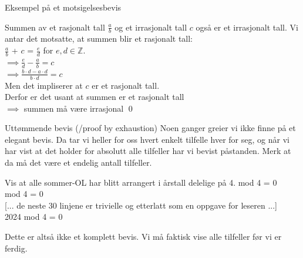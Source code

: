 \begin{frame}{Eksempel på et motsigelsesbevis}
    \begin{block}{Summen av et rasjonalt tall $\frac{a}{b}$ og et irrasjonalt tall $c$ også er et irrasjonalt tall.}
        \pause
        Vi antar det motsatte, at summen blir et rasjonalt tall: \\
        \pause
        $\frac{a}{b}$ + $c$ = $\frac{e}{d}$ for $e, d \in \mathbb{Z}$.\\
        \pause
        $\implies \frac{e}{d} - \frac{a}{b} = c$\\
        \pause
        $\implies \frac{b\cdot d - a \cdot d}{b\cdot d} = c$\\
        \pause
        Men det impliserer at $c$ er et rasjonalt tall. \text{\Lightning}\\
        \pause
        Derfor er det usant at summen er et rasjonalt tall\\
        $\implies$ summen må være irrasjonal
        \qed
    \end{block}
\end{frame}

\begin{frame}{Uttømmende bevis (/proof by exhaustion)}
    Noen ganger greier vi ikke finne på et elegant bevis. Da tar vi heller for oss hvert enkelt tilfelle hver for seg, og når vi har vist at det holder for absolutt alle tilfeller har vi bevist påstanden. Merk at da må det være et endelig antall tilfeller.
    \pause
    \begin{block}{Vis at alle sommer-OL har blitt arrangert i årstall delelige på 4.}
         mod 4 = 0 \checkmark \\
         mod 4 = 0 \checkmark \\
        \pause
        {[... de neste 30 linjene er trivielle og etterlatt som en oppgave for leseren ...]}\\
        2024 mod 4 = 0 \checkmark
    \end{block}
    \pause
    Dette er altså ikke et komplett bevis. Vi må faktisk vise alle tilfeller før vi er ferdig.
\end{frame}
